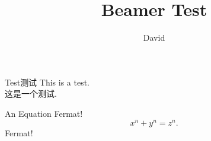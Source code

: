 \documentclass[serif]{beamer}
\title{\textbf{Beamer Test}}
\author{David}
\begin{document}
\begin{frame}
	\maketitle
\end{frame}
\begin{frame}{Test}{测试}
	This is a test.\\
	这是一个测试.
\end{frame}
\begin{frame}{An Equation}
	Fermat!
	\[x^n+y^n=z^n.\]
	Fermat!
\end{frame}
\end{document}
